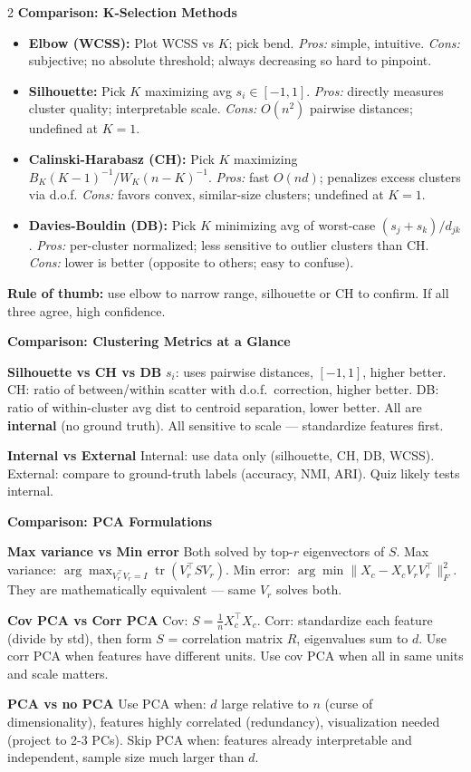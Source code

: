 \documentclass[10pt,fleqn]{article}
\newcommand{\shead}[1]{\vspace{0.1ex}\textbf{\scriptsize #1}\par}
\newcommand{\qa}[2]{\textbf{#1} #2\par}
\DeclareMathOperator{\tr}{tr}
\begin{document}
\begin{multicols*}{2}
\shead{Comparison: K-Selection Methods}
\begin{itemize}
\item \textbf{Elbow (WCSS):} Plot WCSS vs \(K\); pick bend. \textit{Pros:} simple, intuitive. \textit{Cons:} subjective; no absolute threshold; always decreasing so hard to pinpoint.
\item \textbf{Silhouette:} Pick \(K\) maximizing avg \(s_i\in[-1,1]\). \textit{Pros:} directly measures cluster quality; interpretable scale. \textit{Cons:} \(O(n^2)\) pairwise distances; undefined at \(K=1\).
\item \textbf{Calinski-Harabasz (CH):} Pick \(K\) maximizing \(B_K(K{-}1)^{-1}/W_K(n{-}K)^{-1}\). \textit{Pros:} fast \(O(nd)\); penalizes excess clusters via d.o.f. \textit{Cons:} favors convex, similar-size clusters; undefined at \(K=1\).
\item \textbf{Davies-Bouldin (DB):} Pick \(K\) minimizing avg of worst-case \((s_j+s_k)/d_{jk}\). \textit{Pros:} per-cluster normalized; less sensitive to outlier clusters than CH. \textit{Cons:} lower is better (opposite to others; easy to confuse).
\end{itemize}
\textbf{Rule of thumb:} use elbow to narrow range, silhouette or CH to confirm. If all three agree, high confidence.

\shead{Comparison: Clustering Metrics at a Glance}
\qa{Silhouette vs CH vs DB}{\(s_i\): uses pairwise distances, \([-1,1]\), higher better. CH: ratio of between/within scatter with d.o.f.\ correction, higher better. DB: ratio of within-cluster avg dist to centroid separation, lower better. All are \textbf{internal} (no ground truth). All sensitive to scale — standardize features first.}
\qa{Internal vs External}{Internal: use data only (silhouette, CH, DB, WCSS). External: compare to ground-truth labels (accuracy, NMI, ARI). Quiz likely tests internal.}

\shead{Comparison: PCA Formulations}
\qa{Max variance vs Min error}{Both solved by top-\(r\) eigenvectors of \(S\). Max variance: \(\arg\max_{V_r^\top V_r=I}\tr(V_r^\top SV_r)\). Min error: \(\arg\min\|X_c-X_cV_rV_r^\top\|_F^2\). They are mathematically equivalent — same \(V_r\) solves both.}
\qa{Cov PCA vs Corr PCA}{Cov: \(S=\frac1n X_c^\top X_c\). Corr: standardize each feature (divide by std), then form \(S\) = correlation matrix \(R\), eigenvalues sum to \(d\). Use corr PCA when features have different units. Use cov PCA when all in same units and scale matters.}
\qa{PCA vs no PCA}{Use PCA when: \(d\) large relative to \(n\) (curse of dimensionality), features highly correlated (redundancy), visualization needed (project to 2-3 PCs). Skip PCA when: features already interpretable and independent, sample size much larger than \(d\).}


\end{multicols*}
\end{document}
